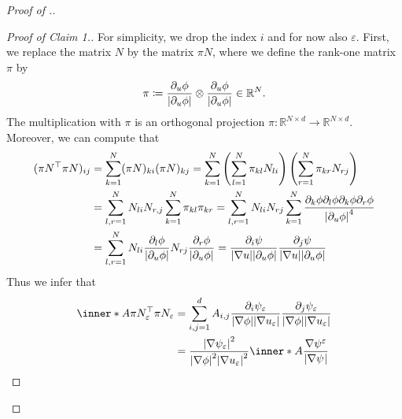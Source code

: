 \begin{proof}[Proof of .]
	\begin{proof}[Proof of Claim 1.]
		For simplicity, we drop the index $ i $ and for now also $ \varepsilon 
		$.
		First, we replace the matrix $ N $ by the matrix $ \pi N $, where we 
		define the rank-one matrix $ \pi $ by
		\begin{equation*}
			\pi 
			\coloneqq
			\frac{ \partial_{ u } \phi }{ \abs{ \partial_{ u } \phi } }
			\otimes
			\frac{ \partial_{ u } \phi }{ \abs{ \partial_{ u } \phi } }
			\in 
			\mathbb{ R }^{ N }.
		\end{equation*}
		The multiplication with $ \pi $ is an orthogonal projection $ \pi 
		\colon \mathbb{ R }^{ N \times d } \to \mathbb{ R }^{ N \times d } $. 
		Moreover, we can compute that
		\begin{align*}
			( \pi N^{ \top } \pi N )_{ i j }
			& =
			\sum_{ k = 1 }^{ N }
				( \pi N )_{ k i }
				( \pi N )_{ k j }
			=
			\sum_{ k = 1 }^{ N }
				\left(
					\sum_{ l = 1 }^{ N }
						\pi_{ k l } N_{ l i }
				\right)
				\left(
					\sum_{ r = 1 }^{ N }
						\pi_{ k r } N_{ r j }
				\right)
			\\
			& =
			\sum_{ l, r = 1 }^{ N }
				N_{ l i } N_{ r , j }
				\sum_{ k = 1 }^{ N }
					\pi_{ k l }
					\pi_{ k r }
			=
			\sum_{ l, r = 1 }^{ N }
				N_{ l i }N_{ r j }
				\sum_{ k = 1 }^{ N }
					\frac{ \partial_{ k } \phi  \partial_{ l } \phi \partial_{ 
					k } \phi \partial_{ r } \phi }{ \abs{ \partial_{ u } \phi 
					}^{ 4 } }
			\\
			& =
			\sum_{ l, r = 1 }^{ N }
				N_{ l i } \frac{ \partial_{ l } \phi }{ \abs{ \partial_{ u } 
				\phi } }
				N_{ r j } \frac{ \partial_{ r } \phi }{ \abs{ \partial_{ u } 
				\phi } }
			=
			\frac{ \partial_{ i } \psi }{ \abs{ \nabla u } \abs{ \partial_{ u } 
			\phi } }
			\frac{ \partial_{ j } \psi }{ \abs{ \nabla u } \abs{ \partial_{ u } 
			\phi } }
		\end{align*}
		Thus we infer that
		\begin{align*}
			\inner*{ A }{ \pi N_{ \varepsilon }^{ \top } \pi N_{ \varepsilon } }
			& =
			\sum_{ i, j = 1 }^{ d }
				A_{ i , j } 
				\frac{ \partial_{ i } \psi_{ \varepsilon } }{ \abs{ \nabla \phi 
				} \abs{ \nabla u_{ \varepsilon } } }
				\frac{ \partial_{ j } \psi_{ \varepsilon } }{ \abs{ \nabla \phi 
				} \abs{ \nabla u_{ \varepsilon } } }
			\\
			& =
			\frac{ \abs{ \nabla \psi_{ \varepsilon } }^{ 2 } }{ \abs{ \nabla 
			\phi }^{ 2 } \abs{ \nabla u_{ \varepsilon } }^{ 2 } }
			\inner*{ A }
			{ \frac{ \nabla \psi^{ \varepsilon } }{ \abs{ \nabla \psi^{ 
}}}}
\end{align*}
\end{proof}
\end{proof}
